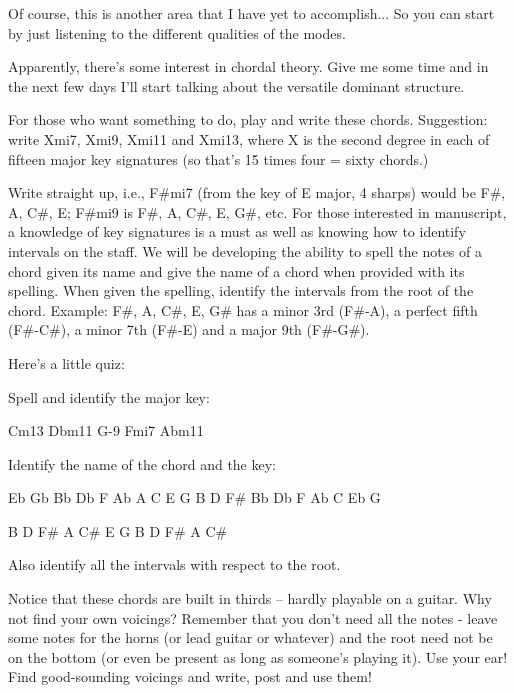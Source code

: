 Of course, this is another area that I have yet to accomplish... So
you can start by just listening to the different qualities of the
modes.

Apparently, there's some interest in chordal theory. Give me some time and
in the next few days I'll start talking about the versatile dominant structure.

For those who want something to do, play and write these chords. Suggestion:
write Xmi7, Xmi9, Xmi11 and Xmi13, where X is the second degree in each of
fifteen major key signatures (so that's 15 times four = sixty chords.)

Write straight up, i.e., F\#mi7 (from the key of E major, 4 sharps) would be
F\#, A, C\#, E; F\#mi9 is F\#, A, C\#, E, G\#, etc. For those interested in
manuscript, a knowledge of key signatures is a must as well as knowing how
to identify intervals on the staff. We will be developing the ability to
spell the notes of a chord given its name and give the name of a chord when
provided with its spelling. When given the spelling, identify the intervals
from the root of the chord. Example: F\#, A, C\#, E, G\# has a minor 3rd (F\#-A),
a perfect fifth (F\#-C\#), a minor 7th (F\#-E) and a major 9th (F\#-G\#).

Here's a little quiz:

Spell and identify the major key:

Cm13   Dbm11   G-9   Fmi7   Abm11

Identify the name of the chord and the key:

Eb Gb Bb Db F Ab       A C E G B D F\#      Bb Db F Ab C Eb G

B D F\# A C\#          E G B D F\# A C\#

Also identify all the intervals with respect to the root.

Notice that these chords are built in thirds -- hardly playable on a guitar.
Why not find your own voicings? Remember that you don't need all the notes -
leave some notes for the horns (or lead guitar or whatever) and the root
need not be on the bottom (or even be present as long as someone's playing
it). Use your ear! Find good-sounding voicings and write, post and use them!
